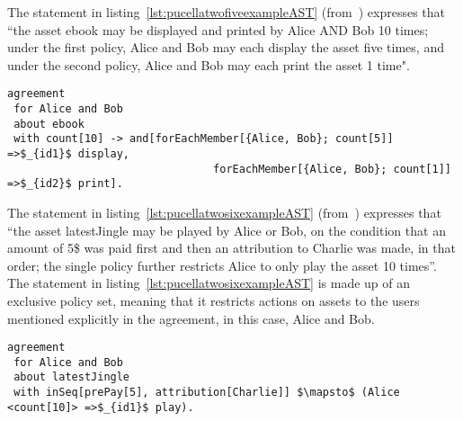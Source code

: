%


The statement in listing~\ref{lst:pucellatwofiveexampleAST} (from~\cite{pucella2006}) expresses that ``the asset ebook may be displayed and printed by Alice AND Bob 10 times; under the first policy, Alice and Bob may each display the asset five times, and under the second policy, Alice and Bob may each print the asset 1 time".


\lstset{language=Pucella2006}
\begin{minipage}[c]{0.95\textwidth}
\begin{lstlisting}[frame=single, caption={Agreement of Example 2.5}, label={lst:pucellatwofiveexampleAST}, mathescape]
agreement
 for Alice and Bob 
 about ebook 
 with count[10] -> and[forEachMember[{Alice, Bob}; count[5]] =>$_{id1}$ display, 
                                forEachMember[{Alice, Bob}; count[1]] =>$_{id2}$ print].
\end{lstlisting}
\end{minipage} 
%


The statement in listing~\ref{lst:pucellatwosixexampleAST} (from~\cite{pucella2006}) expresses that ``the asset latestJingle may be played by Alice or Bob, on the condition that an amount of 5\$ was paid first and then an attribution to Charlie was made, in that order; the single policy further restricts Alice to only play the asset 10 times''. The statement in listing~\ref{lst:pucellatwosixexampleAST} is made up of an exclusive policy set, meaning that it restricts actions on assets to the users mentioned explicitly in the agreement, in this case, Alice and Bob.

\lstset{language=Pucella2006}
\begin{minipage}[c]{0.95\textwidth}
\begin{lstlisting}[frame=single, caption={Agreement of Example 2.6}, label={lst:pucellatwosixexampleAST}, mathescape]
agreement
 for Alice and Bob 
 about latestJingle 
 with inSeq[prePay[5], attribution[Charlie]] $\mapsto$ (Alice <count[10]> =>$_{id1}$ play). 
                                    
\end{lstlisting}
\end{minipage} 
